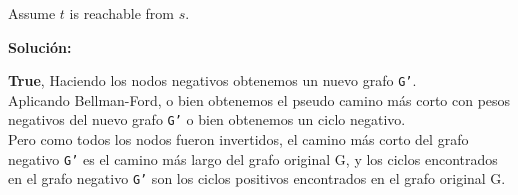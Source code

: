 \documentclass{article}
\begin{document}
\begin{enumerate}
    Assume $t$ is reachable from $s$. 
  
  \textbf{Solución:}
  
  \textbf{True}, Haciendo los nodos negativos obtenemos un nuevo grafo \texttt{G'}.\\
  Aplicando Bellman-Ford, o bien obtenemos el pseudo camino más corto con pesos negativos del nuevo grafo \texttt{G'} o bien obtenemos un ciclo negativo.\\
  Pero como todos los nodos fueron invertidos, el camino más corto del grafo negativo \texttt{G'} es el camino más largo del grafo original G, y los ciclos encontrados en el grafo negativo \texttt{G'} son los ciclos positivos encontrados en el grafo original G.
  
  
  \end{enumerate}
\end{document}

